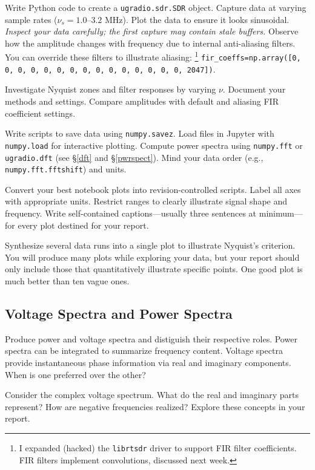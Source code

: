 \documentclass[11pt,preprint]{aastex}
\begin{document}
Write Python code to create a {\tt ugradio.sdr.SDR} object.
Capture data at varying sample rates ($\nu_s = 1.0$--3.2 MHz).
Plot the data to ensure it looks sinusoidal.
{\it Inspect your data carefully; the first capture may contain stale buffers.}
Observe how the amplitude changes with frequency due to internal anti-aliasing filters.
You can override these filters to illustrate aliasing:%
\footnote{I expanded (hacked) the {\tt librtsdr} driver to support FIR filter coefficients.
FIR filters implement convolutions, discussed next week.}
{\tt fir\_coeffs=np.array([0, 0, 0, 0, 0, 0, 0, 0, 0, 0, 0, 0, 0, 0, 0, 2047])}.

Investigate Nyquist zones and filter responses by varying $\nu$.
Document your methods and settings.
Compare amplitudes with default and aliasing FIR coefficient settings.

Write scripts to save data using {\tt numpy.savez}.
Load files in Jupyter with {\tt numpy.load} for interactive plotting.
Compute power spectra using {\tt numpy.fft} or {\tt ugradio.dft}
(see \S\ref{dft} and \S\ref{pwrspect}).
Mind your data order (e.g., {\tt numpy.fft.fftshift}) and units.

Convert your best notebook plots into revision-controlled scripts.
Label all axes with appropriate units.
Restrict ranges to clearly illustrate signal shape and frequency.
Write self-contained captions---usually three sentences at minimum---for every plot destined for your report.

Synthesize several data runs into a single plot to illustrate Nyquist's criterion.
You will produce many plots while exploring your data,
but your report should only include those that quantitatively 
illustrate specific points.
One good plot is much better than ten vague ones.


\subsection{Voltage Spectra and Power Spectra}

\noindent
Produce power and voltage spectra and distiguish their respective roles.
Power spectra can be integrated to summarize frequency content.
Voltage spectra provide instantaneous phase information
via real and imaginary components.
When is one preferred over the other?

Consider the complex voltage spectrum.
What do the real and imaginary parts represent?
How are negative frequencies realized?
Explore these concepts in your report.
\end{document}
